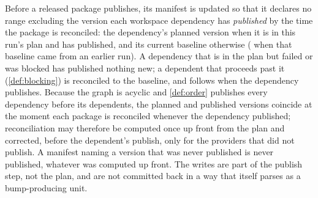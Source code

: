 \begin{definition}
\label{def:manifests}
Before a released package publishes, its manifest is updated so that it
declares no range excluding the version each workspace dependency has
\emph{published} by the time the package is reconciled: the dependency's
planned version when it is in this run's plan and has published, and its
current baseline otherwise ( when that baseline came from an earlier
run). A dependency that is in the plan but failed or was blocked has published
nothing new; a dependent that proceeds past it (\cref{def:blocking}) is
reconciled to the baseline, and  follows when the dependency
publishes. Because the graph is acyclic and \cref{def:order} publishes every
dependency before its dependents, the planned and published versions coincide
at the moment each package is reconciled whenever the dependency published;
reconciliation may therefore be computed once up front from the plan and
corrected, before the dependent's publish, only for the providers that did not
publish. A manifest naming a version that was never published is never
published, whatever was computed up front. The writes are part of the publish
step, not the plan, and are not committed back in a way that itself parses as
a bump-producing unit.
\end{definition}
